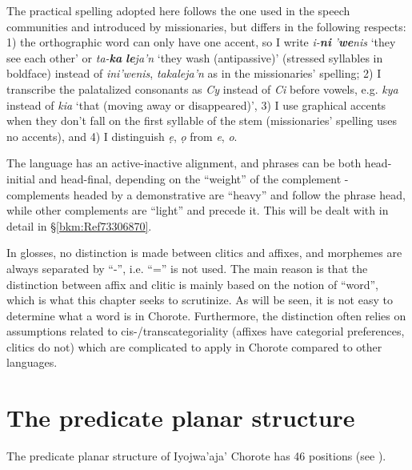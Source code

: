 \documentclass[output=paper]{langscibook}
\begin{document}
The practical spelling adopted here follows the one used in the speech communities and introduced by missionaries, but differs in the following respects: 1) the orthographic word can only have one accent, so I write \textit{i{}-}\textbf{\textit{ni}} \textit{'}\textbf{\textit{we}}\textit{nis} `they see each other' or \textit{ta-}\textbf{\textit{ka}} \textbf{\textit{le}}\textit{ja'n} `they wash (antipassive)' (stressed syllables in boldface) instead of \textit{ini'wenis}, \textit{takaleja'n} as in the missionaries' spelling; 2) I transcribe the palatalized consonants as \textit{Cy} instead of \textit{Ci} before vowels, e.g. \textit{kya} instead of \textit{kia} `that (moving away or disappeared)', 3) I use graphical accents when they don't fall on the first syllable of the stem (missionaries' spelling uses no accents), and 4) I distinguish \textit{ẹ}, \textit{ọ} from \textit{e}, \textit{o}.

The language has an active-inactive alignment, and phrases can be both head-initial and head-final, depending on the ``weight'' of the complement - complements headed by a demonstrative are ``heavy'' and follow the phrase head, while other complements are ``light'' and precede it. This will be dealt with in detail in §\ref{bkm:Ref73306870}.

In glosses, no distinction is made between clitics and affixes, and morphemes are always separated by ``-'', i.e. ``='' is not used. The main reason is that the distinction between affix and clitic is mainly based on the notion of ``word'', which is what this chapter seeks to scrutinize. As will be seen, it is not easy to determine what a word is in Chorote. Furthermore, the distinction often relies on assumptions related to cis-/transcategoriality (affixes have categorial preferences, clitics do not) which are complicated to apply in Chorote compared to other languages.

\section{The predicate planar structure} 
\label{bkm:Ref88847287}
The predicate planar structure of Iyojwa'aja' Chorote has 46 positions (see ).
\end{document}
